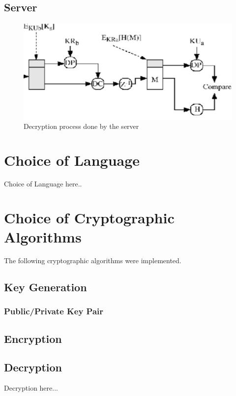 \documentclass[a4paper,10pt]{article}
\begin{document}
\subsection{Server}
\begin{figure}[H]
\centering
\includegraphics[width=0.7\linewidth]{Server_Side}
\caption{Decryption process done by the server}
\label{fig:Server_Side}
\end{figure}

\section{Choice of Language}
Choice of Language here..
\section{Choice of Cryptographic Algorithms}
The following cryptographic algorithms were implemented.

\subsection{Key Generation}
\subsubsection{Public/Private Key Pair}

\subsection{Encryption}


\subsection{Decryption}
Decryption here...
\end{document}
